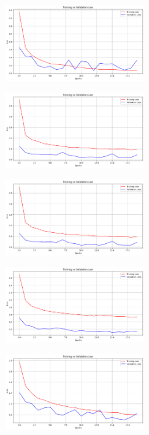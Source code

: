 \begin{multicols}{2}
\vspace{0.5cm}

\includegraphics[width=0.45\textwidth]{Assets/validation_loss/DENSENET201.png}

\vspace{0.5cm}

\includegraphics[width=0.45\textwidth]{Assets/validation_loss/EfficientNetB0.png}

\vspace{0.5cm}

\newpage

\includegraphics[width=0.45\textwidth]{Assets/validation_loss/EfficientNetB0.png}

\vspace{0.8cm}

\includegraphics[width=0.45\textwidth]{Assets/validation_loss/EfficientNetV2L.png}

\vspace{0.8cm}

\includegraphics[width=0.45\textwidth]{Assets/validation_loss/MOBILENETV2.png}


\end{multicols}
